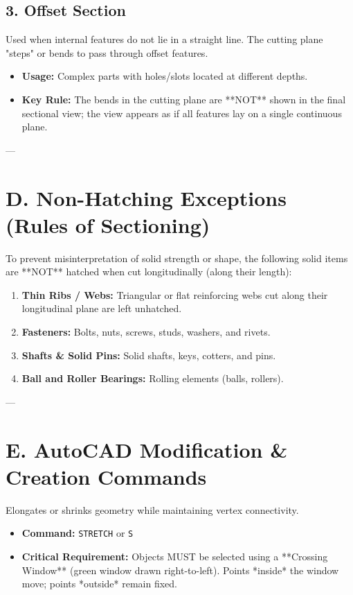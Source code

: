 \subsection{3. Offset Section}
Used when internal features do not lie in a straight line. The cutting plane "steps" or bends to pass through offset features.
\begin{itemize}
    \item \textbf{Usage:} Complex parts with holes/slots located at different depths.
    \item \textbf{Key Rule:} The bends in the cutting plane are **NOT** shown in the final sectional view; the view appears as if all features lay on a single continuous plane.
\end{itemize}

---

\section{D. Non-Hatching Exceptions (Rules of Sectioning)}

\begin{importantrule}
To prevent misinterpretation of solid strength or shape, the following solid items are **NOT** hatched when cut longitudinally (along their length):
\begin{enumerate}
    \item \textbf{Thin Ribs / Webs:} Triangular or flat reinforcing webs cut along their longitudinal plane are left unhatched.
    \item \textbf{Fasteners:} Bolts, nuts, screws, studs, washers, and rivets.
    \item \textbf{Shafts \& Solid Pins:} Solid shafts, keys, cotters, and pins.
    \item \textbf{Ball and Roller Bearings:} Rolling elements (balls, rollers).
\end{enumerate}
\end{importantrule}

---

\section{E. AutoCAD Modification \& Creation Commands}

\begin{autocadcmd}[STRETCH]
Elongates or shrinks geometry while maintaining vertex connectivity.
\begin{itemize}
    \item \textbf{Command:} \texttt{STRETCH} or \texttt{S}
    \item \textbf{Critical Requirement:} Objects MUST be selected using a **Crossing Window** (green window drawn right-to-left). Points *inside* the window move; points *outside* remain fixed.
\end{itemize}
\end{autocadcmd}

